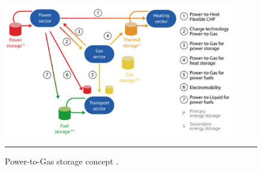 \begin{figure}[htbp]
	\centering
	\includegraphics[width=0.9\textwidth]{figures/p2g.png}
	\rule{\textwidth}{0.5pt} %
	\caption{Power-to-Gas storage concept \citep[p.~2781]{Sterner2017}.}
	\label{fig:p2g}
\end{figure}